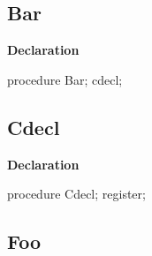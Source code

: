 \documentclass{report}
\newif\ifpdf
\begin{document}
\subsection*{Bar}
\fi
\label{ok_directive_as_identifier-Bar}
\begin{list}{}{
\setlength{\itemindent}{0cm}
\setlength{\listparindent}{0cm}
\setlength{\leftmargin}{\evensidemargin}
\addtolength{\leftmargin}{\tmplength}
\settowidth{\labelsep}{X}
\addtolength{\leftmargin}{\labelsep}
\setlength{\labelwidth}{\tmplength}
}
\item[\textbf{Declaration}\hfill]
\ifpdf
\begin{flushleft}
\fi
\begin{ttfamily}
procedure Bar; cdecl;\end{ttfamily}

\ifpdf
\end{flushleft}
\fi

\end{list}
\ifpdf
\subsection*{\large{\textbf{Cdecl}}\normalsize\hspace{1ex}\hrulefill}
\else
\subsection*{Cdecl}
\fi
\label{ok_directive_as_identifier-Cdecl}
\begin{list}{}{
\setlength{\itemindent}{0cm}
\setlength{\listparindent}{0cm}
\setlength{\leftmargin}{\evensidemargin}
\addtolength{\leftmargin}{\tmplength}
\settowidth{\labelsep}{X}
\addtolength{\leftmargin}{\labelsep}
\setlength{\labelwidth}{\tmplength}
}
\item[\textbf{Declaration}\hfill]
\ifpdf
\begin{flushleft}
\fi
\begin{ttfamily}
procedure Cdecl; register;\end{ttfamily}

\ifpdf
\end{flushleft}
\fi

\end{list}
\ifpdf
\subsection*{\large{\textbf{Foo}}\normalsize\hspace{1ex}\hrulefill}
\else
\end{document}
